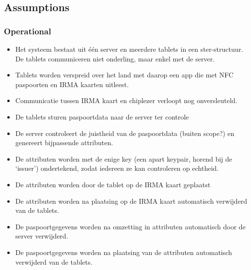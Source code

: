 \subsection{Assumptions}
\label{sec:assumptions}
\subsubsection{Operational}
\begin{itemize}
  \item Het systeem bestaat uit één server en meerdere tablets in een ster-structuur. De tablets communiceren niet onderling, maar enkel met de server.
  \item Tablets worden verspreid over het land met daarop een app die met NFC paspoorten en IRMA kaarten uitleest.
  \item Communicatie tussen IRMA kaart en chiplezer verloopt nog onversleuteld.
  \item De tablets sturen paspoortdata naar de server ter controle
  \item De server controleert de juistheid van de paspoortdata (buiten scope?) en genereert bijpassende attributen. 
  \item De attributen worden met de enige key (een apart keypair, horend bij de `issuer') ondertekend, zodat iedereen ze kan controleren op echtheid.
  \item De attributen worden door de tablet op de IRMA kaart geplaatst
  \item De attributen worden na plaatsing op de IRMA kaart automatisch verwijderd van de tablets.
  \item De paspoortgegevens worden na omzetting in attributen automatisch door de server verwijderd.
  \item De paspoortgegevens worden na plaatsing van de attributen automatisch verwijderd van de tablets.
\end{itemize}

